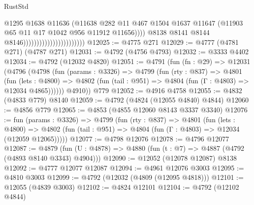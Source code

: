 \begin{lexlean}{RustStd}
\begin{coremodule}
                                                      @1295
                                                      @1638
                                                      @11636
                                                      (@11638
                                                        @282
                                                        @11
                                                        @467
                                                        @1504
                                                        @1637
                                                        @11647
                                                        (@11903
                                                          @65
                                                          @11
                                                          @17
                                                          @1042
                                                          @956
                                                          @11912
                                                          @11656))))
                                                  @8138
                                                  @8141
                                                  @8144
                                                  @8146)))))))))))))))))))))))
@12025 := @4775 @271
@12029 := @4777 (@4781 @271) (@4787 @271)
@12031 := @4792 (@4756 @4793)
@12032 := @3333 @4402
@12034 := @4792 (@12032 @4820)
@12051 := @4791
    (fun (fn : @29) =>
    @12031
      (@4796
        (@4798
          (fun (params : @3326) =>
          @4799
            (fun (rty : @837) =>
            @4801
              (fun (lets : @4800) =>
              @4802 (fun (tail : @951) => @4804 (fun (Γ : @4803) => @12034 @4865))))))
        @4910))
    @779
@12052 := @4916 @4758
@12055 := @4832 (@4833 @779) @8140
@12059 := @4792 (@4824 (@12055 @4840) @4844)
@12060 := @4856 @779
@12065 := @4853 (@4855 @12060 @8143 @3337 @3340)
@12076 := fun (params : @3326) =>
  @4799
    (fun (rty : @837) =>
    @4801
      (fun (lets : @4800) =>
      @4802 (fun (tail : @951) => @4804 (fun (Γ : @4803) => @12034 (@12059 @12065)))))
@12077 := @4798 @12076
@12078 := @4796 @12077
@12087 := @4879 (fun (U : @4878) => @4880 (fun (t : @7) => @4887 (@4792 (@4893 @8140 @3343) @4904)))
@12090 := @12052 (@12078 @12087) @8138
@12092 := @4777 @12077 @12087
@12094 := @4961 @12076 @3003
@12095 := @4810 @3003
@12099 := @4792 (@12032 (@4809 (@12095 @4818)))
@12101 := @12055 (@4839 @3003)
@12102 := @4824 @12101
@12104 := @4792 (@12102 @4844)

\end{coremodule}
\end{lexlean}
